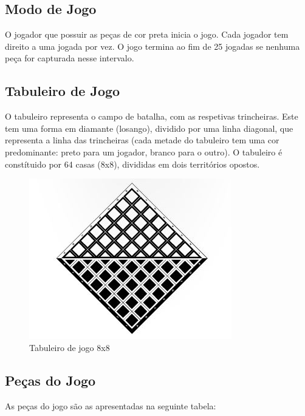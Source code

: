 \subsection{Modo de Jogo}

O jogador que possuir as peças de cor preta inicia o jogo.
Cada jogador tem direito a uma jogada por vez.
O jogo termina ao fim de 25 jogadas se nenhuma peça for capturada nesse intervalo.

\newpage

\subsection{Tabuleiro de Jogo}

O tabuleiro representa o campo de batalha, com as respetivas trincheiras.
Este tem uma forma em diamante (losango), dividido por uma linha diagonal, que representa a linha das trincheiras
(cada metade do tabuleiro tem uma cor predominante: preto para um jogador, branco para o outro).
O tabuleiro é constítuido por 64 casas (8x8), divididas em dois territórios opostos.

\begin{figure}[h!]
\begin{center}
\includegraphics[scale=0.5]{img/board.jpg}
\caption{Tabuleiro de jogo 8x8}
\label{fig:1}
\end{center}
\end{figure}

\subsection{Peças do Jogo}

As peças do jogo são as apresentadas na seguinte tabela:


